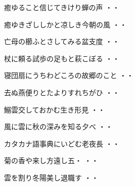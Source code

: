 \vspace{0.6cm}
\begin{shiika}癒ゆること信じてきけり蝉の声
\hfill{・・}\end{shiika}
\vspace{0.6cm}
\begin{shiika}癒ゆきざししかと凉しき今朝の風
\hfill{・・}\end{shiika}
\vspace{0.6cm}
\begin{shiika}亡母の櫛ふとさしてみる盆支度
\hfill{・・}\end{shiika}
\vspace{0.6cm}
\begin{shiika}杖に頼る試歩の足もと萩こぼる
\hfill{・・}\end{shiika}
\vspace{0.6cm}
\begin{shiika}寝団扇にうちわどころの故郷のこと
\hfill{・・}\end{shiika}
\vspace{0.6cm}
\begin{shiika}去ぬ燕便りとたよりすれちがひ
\hfill{・・}\end{shiika}
\vspace{0.6cm}
\begin{shiika}鰯雲交しておかむ生き形見
\hfill{・・}\end{shiika}
\vspace{0.6cm}
\begin{shiika}風に雲に秋の深みを知る夕べ
\hfill{・・}\end{shiika}
\vspace{0.6cm}
\begin{shiika}カタカナ語事典にいどむ老夜長
\hfill{・・}\end{shiika}
\vspace{0.6cm}
\begin{shiika}菊の香や来し方遠し五・
\hfill{・・}\end{shiika}
\vspace{0.6cm}
\begin{shiika}雲を割り冬陽美し退職す
\hfill{・・}\end{shiika}

